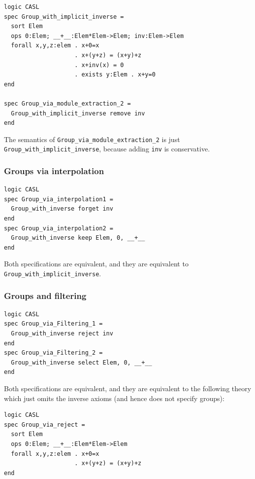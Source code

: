 \documentclass[10pt,fleqn,final]{scrreprt}
\newcommand*{\syntax}[1]{\texttt{#1}}
\newcommand{\sssclause}[1]{\subsubsection{#1}}
\begin{document}
\begin{lstlisting}[basicstyle=\ttfamily,language=dolText,morekeywords={props,ObjectProperty,Class,DisjointUnionOf,SubClassOf,Characteristics,Transitive,Asymmetric,SubPropertyOf,DisjointClasses,EquivalentTo,inverse,only,forall,iff,if,or,exists,sort,ops,spec,forget},escapechar=@,mathescape]
logic CASL
spec Group_with_implicit_inverse =
  sort Elem
  ops 0:Elem; __+__:Elem*Elem->Elem; inv:Elem->Elem
  forall x,y,z:elem . x+0=x
                    . x+(y+z) = (x+y)+z
                    . x+inv(x) = 0
                    . exists y:Elem . x+y=0
end

spec Group_via_module_extraction_2 =
  Group_with_implicit_inverse remove inv
end
\end{lstlisting}
The semantics of \syntax{Group\_via\_module\_extraction\_2} is just
\syntax{Group\_with\_implicit\_inverse}, because adding \texttt{inv}
is conservative.
\medskip

\sssclause{Groups via interpolation}

\begin{lstlisting}[basicstyle=\ttfamily,language=dolText,morekeywords={props,ObjectProperty,Class,DisjointUnionOf,SubClassOf,Characteristics,Transitive,Asymmetric,SubPropertyOf,DisjointClasses,EquivalentTo,inverse,only,forall,iff,if,or,exists,sort,ops,spec,forget},escapechar=@,mathescape]
logic CASL
spec Group_via_interpolation1 =
  Group_with_inverse forget inv
end
spec Group_via_interpolation2 =
  Group_with_inverse keep Elem, 0, __+__
end
\end{lstlisting}
Both specifications are equivalent, and they 
are equivalent to \syntax{Group\_with\_implicit\_inverse}.
\medskip

\sssclause{Groups and filtering}
\begin{lstlisting}[basicstyle=\ttfamily,language=dolText,morekeywords={props,ObjectProperty,Class,DisjointUnionOf,SubClassOf,Characteristics,Transitive,Asymmetric,SubPropertyOf,DisjointClasses,EquivalentTo,inverse,only,forall,iff,if,or,exists,sort,ops,spec,forget},escapechar=@,mathescape]
logic CASL
spec Group_via_Filtering_1 =
  Group_with_inverse reject inv
end
spec Group_via_Filtering_2 =
  Group_with_inverse select Elem, 0, __+__
end
\end{lstlisting}
Both specifications are equivalent, and they are equivalent 
to the following theory which just omits the inverse
axioms (and hence does not specify groups):
\begin{lstlisting}[basicstyle=\ttfamily,language=dolText,morekeywords={props,ObjectProperty,Class,DisjointUnionOf,SubClassOf,Characteristics,Transitive,Asymmetric,SubPropertyOf,DisjointClasses,EquivalentTo,inverse,only,forall,iff,if,or,exists,sort,ops,spec,forget},escapechar=@,mathescape]
logic CASL
spec Group_via_reject =
  sort Elem
  ops 0:Elem; __+__:Elem*Elem->Elem
  forall x,y,z:elem . x+0=x
                    . x+(y+z) = (x+y)+z
end
\end{lstlisting}
\end{document}

